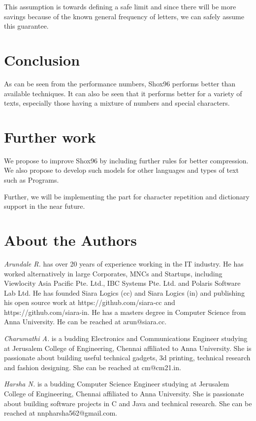 \documentclass[]{article}
\begin{document}
This assumption is towards defining a safe limit and since there will be more savings because of the known general frequency of letters, we can safely assume this guarantee.

\section{Conclusion}

As can be seen from the performance numbers, Shox96 performs better than available techniques.  It can also be seen that it performs better for a variety of texts, especially those having a mixture of numbers and special characters.

\section{Further work}

We propose to improve Shox96 by including further rules for better compression.  We also propose to develop such models for other languages and types of text such as Programs.

Further, we will be implementing the part for character repetition and dictionary support in the near future.

\section{About the Authors}

\emph{Arundale R.} has over 20 years of experience working in the IT industry.  He has worked alternatively in large Corporates, MNCs and Startups, including Viewlocity Asia Pacific Pte. Ltd., IBC Systems Pte. Ltd. and Polaris Software Lab Ltd. He has founded Siara Logics (cc) and Siara Logics (in) and publishing his open source work at https://github.com/siara-cc and https://github.com/siara-in. He has a masters degree in Computer Science from Anna University.  He can be reached at arun@siara.cc.

\emph{Charumathi A.} is a budding Electronics and Communications Engineer studying at Jerusalem College of Engineering, Chennai affiliated to Anna University.  She is passionate about building useful technical gadgets, 3d printing, technical research and fashion designing.  She can be reached at cm@cm21.in.

\emph{Harsha N.} is a budding Computer Science Engineer studying at Jerusalem College of Engineering, Chennai affiliated to Anna University.  She is passionate about building software projects in C and Java and technical research.  She can be reached at nnpharsha562@gmail.com.
\end{document}
